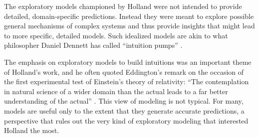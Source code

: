 \documentclass{sig-alternate}
\begin{document}

The exploratory models championed by Holland were not intended to
provide detailed, domain-specific predictions.  Instead they were
meant to explore possible general mechanisms of complex systems and
thus provide insights that might lead to more specific, detailed
models.  Such idealized models are akin to what philosopher Daniel Dennett has called
``intuition pumps'' \cite{Dennett1984}.

The emphasis on exploratory models to build intuitions was an
important theme of Holland's work, and he often quoted Eddington's
remark on the occasion of the first experimental test of Einstein's
theory of relativity: ``The contemplation in natural science of a wider
domain than the actual leads to a far better understanding of the
actual'' \cite{Eddington1927}.
This view of modeling is not typical.  For many, models
are useful only to the extent that they generate accurate predictions, a
perspective that rules out the very kind of exploratory modeling that
interested Holland the most.

\end{document}
